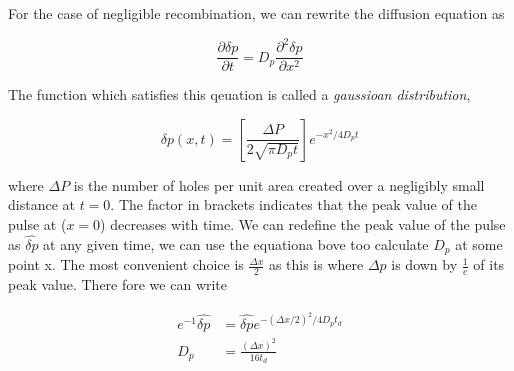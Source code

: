 For the case of negligible recombination, we can rewrite the diffusion equation as 


\begin{equation*}
    \frac{\partial \delta p}{\partial t}=D_{p} \frac{\partial^{2} \delta p}{\partial x^{2}}
\end{equation*}

The function which satisfies this qeuation is called a \textit{gaussioan distribution},

\begin{equation*}
    \delta p(x, t)=\left[\frac{\Delta P}{2 \sqrt{\pi D_{p} t}}\right] e^{-x^{2} / 4 D_{p} t}
\end{equation*}

where $\Delta P$ is the number of holes per unit area created over a negligibly small distance at $t=0$. The factor in brackets indicates that the peak value of the pulse at ($x=0$) decreases with time. We can redefine the peak value of the pulse as $\widehat{\delta p}$ at any given time, we can use the equationa bove too calculate $D_p$ at some point x. The most convenient choice is $\frac{\Delta x}{2}$ as this is where $\Delta p$ is down by $\frac{1}{e}$ of its peak value. There fore we can write

\begin{equation*}
    \begin{aligned} e^{-1} \widehat{\delta p} & =\widehat{\delta p} e^{-(\Delta x / 2)^{2} / 4 D_{p} t_{d}} \\ D_{p} & =\frac{(\Delta x)^{2}}{16 t_{d}}\end{aligned}
\end{equation*}
